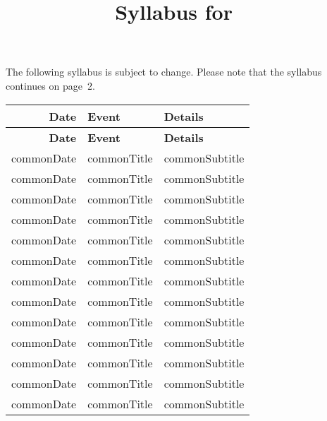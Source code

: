 \documentclass{article}
\title{Syllabus for \commonCourse\ \commonTerm}
\date{\commonDate}
\author{\commonAuthor}
\newcommand{\dateOf}[1]{\csname commonDate#1\endcsname}
\newcommand{\titleOf}[1]{\csname commonTitle#1\endcsname}
\newcommand{\subtitleOf}[1]{\csname commonSubtitle#1\endcsname}
\begin{document}
\maketitle

The following syllabus is subject to change.  Please note that the
syllabus continues on page~2.

\begin{longtable}[H]{|r|l|l|}
  \hline       \textbf{Date} & \textbf{Event} & \textbf{Details} \\
  \hline       \endfirsthead
  \hline       \textbf{Date} & \textbf{Event} & \textbf{Details} \\
  \hline
  \endhead
  \dateOf{\commonEventNegativeOne} & \titleOf{\commonEventNegativeOne} & \subtitleOf{\commonEventNegativeOne} \\ \hline
  \dateOf{\commonEventZeroZeroOne} & \titleOf{\commonEventZeroZeroOne} & \subtitleOf{\commonEventZeroZeroOne} \\ \hline
  \dateOf{\commonEventZeroZeroA} & \titleOf{\commonEventZeroZeroA} & \subtitleOf{\commonEventZeroZeroA} \\ \hline
  \dateOf{\commonEventZeroZeroB} & \titleOf{\commonEventZeroZeroB} & \subtitleOf{\commonEventZeroZeroB} \\ \hline
  \dateOf{\commonEventZeroZeroC} & \titleOf{\commonEventZeroZeroC} & \subtitleOf{\commonEventZeroZeroC} \\ \hline
  \dateOf{\commonEventZeroZeroD} & \titleOf{\commonEventZeroZeroD} & \subtitleOf{\commonEventZeroZeroD} \\ \hline
  \dateOf{\commonEventZeroOneOne} & \titleOf{\commonEventZeroOneOne} & \subtitleOf{\commonEventZeroOneOne} \\ \hline
  \dateOf{\commonEventZero} & \titleOf{\commonEventZero} & \subtitleOf{\commonEventZero} \\ \hline
  \dateOf{\commonEventOne} & \titleOf{\commonEventOne} & \subtitleOf{\commonEventOne} \\ \hline
  \dateOf{\commonEventTwo} & \titleOf{\commonEventTwo} & \subtitleOf{\commonEventTwo} \\ \hline
  \dateOf{\commonEventThree} & \titleOf{\commonEventThree} & \subtitleOf{\commonEventThree} \\ \hline
  \dateOf{\commonEventFour} & \titleOf{\commonEventFour} & \subtitleOf{\commonEventFour} \\ \hline
  \dateOf{\commonEventFive} & \titleOf{\commonEventFive} & \subtitleOf{\commonEventFive} \\ \hline

\end{longtable}
\end{document}
